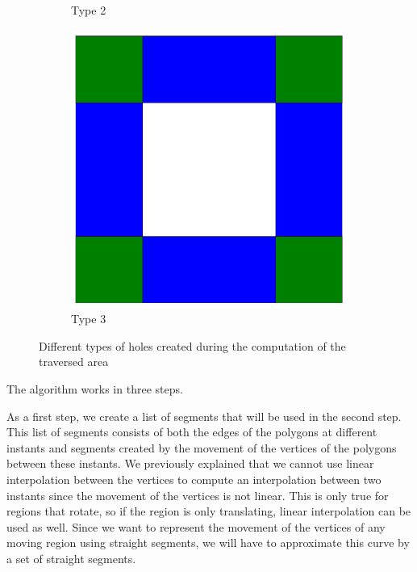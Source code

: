 \begin{figure}[h!]
\begin{subfigure}{.3\textwidth}
        \caption{Type 2}
        \label{fig:hole_type_2}
    \end{subfigure}
    \hfill
    \begin{subfigure}{.3\textwidth}
        \centering
        \includegraphics[width=\textwidth]{images/hole_3.pdf}
        \caption{Type 3}
        \label{fig:hole_type_3}
    \end{subfigure}
    \caption{Different types of holes created during the computation of the traversed area}
    \label{fig:hole_types}
\end{figure}

\noindent The algorithm works in three steps.

As a first step, we create a list of segments that will be used in the second step. This list of segments consists of both the edges of the polygons at different instants and segments created by the movement of the vertices of the polygons between these instants. We previously explained that we cannot use linear interpolation between the vertices to compute an interpolation between two instants since the movement of the vertices is not linear. This is only true for regions that rotate, so if the region is only translating, linear interpolation can be used as well. Since we want to represent the movement of the vertices of any moving region using straight segments, we will have to approximate this curve by a set of straight segments. 

